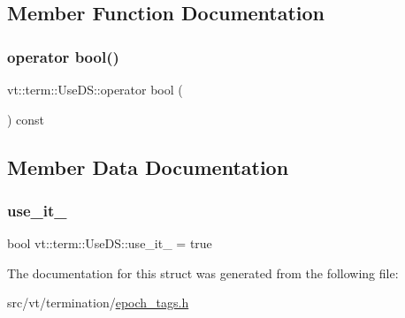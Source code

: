 \subsection{Member Function Documentation}
\mbox{\label{structvt_1_1term_1_1_use_d_s_a054eedc5eedc9ea9c900bd9080ba8de2}} 
\subsubsection{\texorpdfstring{operator bool()}{operator bool()}}
{\footnotesize\ttfamily vt\+::term\+::\+Use\+D\+S\+::operator bool (\begin{DoxyParamCaption}{ }\end{DoxyParamCaption}) const\hspace{0.3cm}{\ttfamily [inline]}}



\subsection{Member Data Documentation}
\mbox{\label{structvt_1_1term_1_1_use_d_s_a90e938697cc42b12536e2b5d1a6c6c2d}} 
\subsubsection{\texorpdfstring{use\+\_\+it\+\_\+}{use\_it\_}}
{\footnotesize\ttfamily bool vt\+::term\+::\+Use\+D\+S\+::use\+\_\+it\+\_\+ = true}



The documentation for this struct was generated from the following file\+:\begin{DoxyCompactItemize}
\item 
src/vt/termination/\hyperlink{epoch__tags_8h}{epoch\+\_\+tags.\+h}\end{DoxyCompactItemize}
